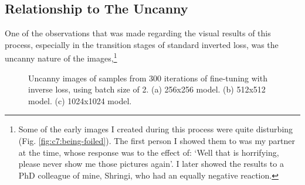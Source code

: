 \subsection{Relationship to The Uncanny}

One of the observations that was made regarding the visual results of this process, especially in the transition stages of standard inverted loss, was the uncanny nature of the images,\footnote{
      Some of the early images I created during this process were quite disturbing (Fig. \ref{fig:c7:being-foiled}). The first person I showed them to was my partner at the time, whose response was to the effect of: `Well that is horrifying, please never show me those pictures again'. I later showed the results to a PhD colleague of mine, Shringi, who had an equally negative reaction.}

\begin{figure}[!htbp]
  \vspace{-60pt}
  \centering
  \hfill
  \hfill
  \caption[Uncanny images of samples from 300 iterations of fine-tuning with inverse loss]{Uncanny images of samples from 300 iterations of fine-tuning with inverse loss, using batch size of 2. (a) 256x256 model. (b) 512x512 model. (c) 1024x1024 model. }
  \label{fig:c4:uncanny-images-og}
\end{figure}

